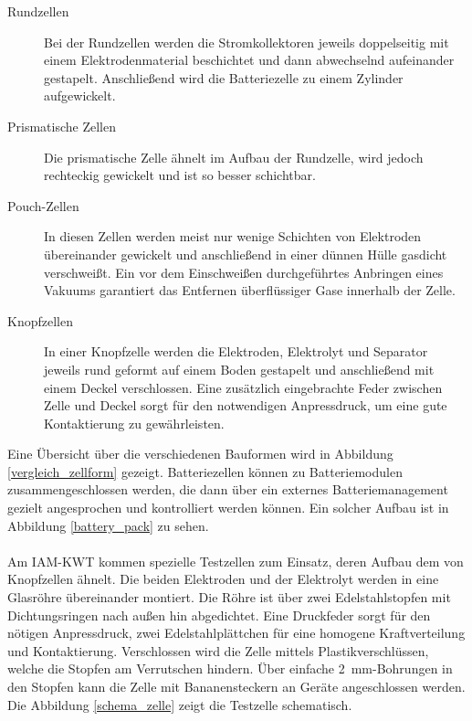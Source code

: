 \documentclass[a4paper, 11pt, headsepline,footsepline,twoside,abstract]{scrbook}
\begin{document}
\begin{description}
\item[Rundzellen] Bei der Rundzellen werden die Stromkollektoren jeweils doppelseitig mit einem Elektrodenmaterial beschichtet und dann abwechselnd aufeinander gestapelt. Anschließend wird die Batteriezelle zu einem Zylinder aufgewickelt.
\item[Prismatische Zellen] Die prismatische Zelle ähnelt im Aufbau der Rundzelle, wird jedoch rechteckig gewickelt und ist so besser schichtbar.
\item[Pouch-Zellen] In diesen Zellen werden meist nur wenige Schichten von Elektroden übereinander gewickelt und anschließend in einer dünnen Hülle gasdicht verschweißt. Ein vor dem Einschweißen durchgeführtes Anbringen eines Vakuums garantiert das Entfernen überflüssiger Gase innerhalb der Zelle.
\item[Knopfzellen] In einer Knopfzelle werden die Elektroden, Elektrolyt und Separator jeweils rund geformt auf einem Boden gestapelt und anschließend mit einem Deckel verschlossen. Eine zusätzlich eingebrachte Feder zwischen Zelle und Deckel sorgt für den notwendigen Anpressdruck, um eine gute Kontaktierung zu gewährleisten.
\end{description}
Eine Übersicht über die verschiedenen Bauformen wird in Abbildung \ref{vergleich_zellform} gezeigt. Batteriezellen können zu Batteriemodulen zusammengeschlossen werden, die dann über ein externes Batteriemanagement gezielt angesprochen und kontrolliert werden können. Ein solcher Aufbau ist in Abbildung \ref{battery_pack} zu sehen.
\\\\
Am IAM-KWT kommen spezielle Testzellen zum Einsatz, deren Aufbau dem von Knopfzellen ähnelt. Die beiden Elektroden und der Elektrolyt werden in eine Glasröhre übereinander montiert. Die Röhre ist über zwei Edelstahlstopfen mit Dichtungsringen nach außen hin abgedichtet. Eine Druckfeder sorgt für den nötigen Anpressdruck, zwei Edelstahlplättchen für eine homogene Kraftverteilung und Kontaktierung. Verschlossen wird die Zelle mittels Plastikverschlüssen, welche die Stopfen am Verrutschen hindern. Über einfache \SI{2}{\milli\metre}-Bohrungen in den Stopfen kann die Zelle mit Bananensteckern an Geräte angeschlossen werden. Die Abbildung \ref{schema_zelle} zeigt die Testzelle schematisch.
\end{document}
